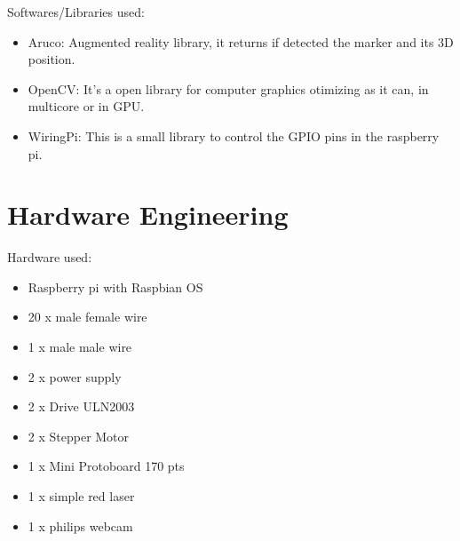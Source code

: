 \documentclass{article}
\begin{document}
Softwares/Libraries used:
\begin{itemize}
    \item Aruco: Augmented reality library, it returns if detected the marker
and its 3D position.
    \item OpenCV: It's a open library for computer graphics otimizing as it can,
in multicore or in GPU. 
    \item WiringPi: This is a small library to control the GPIO pins in the
raspberry pi.
\end{itemize}

\section{Hardware Engineering}

Hardware used:
\begin{itemize}
    \item Raspberry pi with Raspbian OS
    \item 20 x male female wire
    \item 1 x male male wire
    \item 2 x power supply
    \item 2 x Drive ULN2003
    \item 2 x Stepper Motor
    \item 1 x Mini Protoboard 170 pts
    \item 1 x simple red laser
    \item 1 x philips webcam
\end{itemize}
\end{document}
